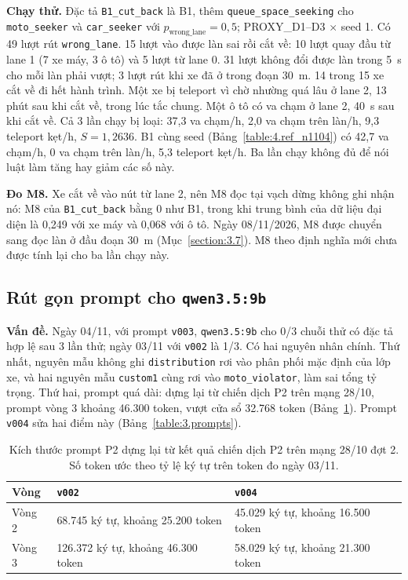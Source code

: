 \documentclass[../main.tex]{subfiles}
\begin{document}
\textbf{Chạy thử.} Đặc tả \texttt{B1\_cut\_back} là B1, thêm \texttt{queue\_space\_seeking} cho \texttt{moto\_seeker} và \texttt{car\_seeker} với $p_{\text{wrong\_lane}} = 0{,}5$; PROXY\_D1--D3 $\times$ seed 1.
Có 49 lượt rút \texttt{wrong\_lane}. 15 lượt vào được làn sai rồi cắt về: 10 lượt quay đầu từ lane 1 (7 xe máy, 3 ô tô) và 5 lượt từ lane 0. 31 lượt không đổi được làn trong 5~s cho mỗi làn phải vượt; 3 lượt rút khi xe đã ở trong đoạn 30~m. 14 trong 15 xe cắt về đi hết hành trình. Một xe bị teleport vì chờ nhường quá lâu ở lane 2, 13 phút sau khi cắt về, trong lúc tắc chung. Một ô tô có va chạm ở lane 2, 40~s sau khi cắt về. Cả 3 lần chạy bị loại: 37,3 va chạm/h, 2,0 va chạm trên làn/h, 9,3 teleport kẹt/h, $S = 1{,}2636$. B1 cùng seed (Bảng~\ref{table:4.ref_n1104}) có 42,7 va chạm/h, 0 va chạm trên làn/h, 5,3 teleport kẹt/h. Ba lần chạy không đủ để nói luật làm tăng hay giảm các số này.

\textbf{Đo M8.} Xe cắt về vào nút từ lane 2, nên M8 đọc tại vạch dừng không ghi nhận nó: M8 của \texttt{B1\_cut\_back} bằng 0 như B1, trong khi trung bình của dữ liệu đại diện là 0,249 với xe máy và 0,068 với ô tô. Ngày 08/11/2026, M8 được chuyển sang đọc làn ở đầu đoạn 30~m (Mục~\ref{section:3.7}). M8 theo định nghĩa mới chưa được tính lại cho ba lần chạy này.

\subsection{Rút gọn prompt cho \texttt{qwen3.5:9b}}
\label{subsection:prompt_v004}

\textbf{Vấn đề.} Ngày 04/11, với prompt \texttt{v003}, \texttt{qwen3.5:9b} cho 0/3 chuỗi thử có đặc tả hợp lệ sau 3 lần thử; ngày 03/11 với \texttt{v002} là 1/3. Có hai nguyên nhân chính. Thứ nhất, nguyên mẫu không ghi \texttt{distribution} rơi vào phân phối mặc định của lớp xe, và hai nguyên mẫu \texttt{custom1} cùng rơi vào \texttt{moto\_violator}, làm sai tổng tỷ trọng. Thứ hai, prompt quá dài: dựng lại từ chiến dịch P2 trên mạng 28/10, prompt vòng 3 khoảng 46.300 token, vượt cửa sổ 32.768 token (Bảng~\ref{table:4.prompt_size}). Prompt \texttt{v004} sửa hai điểm này (Bảng~\ref{table:3.prompts}).

\begin{table}[H]
\centering
\small
\caption{Kích thước prompt P2 dựng lại từ kết quả chiến dịch P2 trên mạng 28/10 đợt 2. Số token ước theo tỷ lệ ký tự trên token đo ngày 03/11.} \label{table:4.prompt_size}
\begin{tabular}{|p{2.0cm}|p{5.0cm}|p{5.0cm}|}
\hline
\textbf{Vòng} & \textbf{\texttt{v002}} & \textbf{\texttt{v004}} \\ \hline
Vòng 2 & 68.745 ký tự, khoảng 25.200 token & 45.029 ký tự, khoảng 16.500 token \\ \hline
Vòng 3 & 126.372 ký tự, khoảng 46.300 token & 58.029 ký tự, khoảng 21.300 token \\ \hline
\end{tabular}
\end{table}
\end{document}
